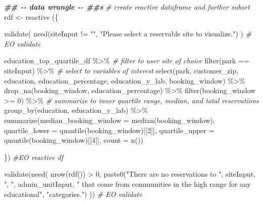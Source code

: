 \documentclass[
  11 pt,
  openany]{book}
\newenvironment{Shaded}{\begin{snugshade}}{\end{snugshade}}
\newcommand{\AttributeTok}[1]{\textcolor[rgb]{0.77,0.63,0.00}{#1}}
\newcommand{\CommentTok}[1]{\textcolor[rgb]{0.56,0.35,0.01}{\textit{#1}}}
\newcommand{\DecValTok}[1]{\textcolor[rgb]{0.00,0.00,0.81}{#1}}
\newcommand{\DocumentationTok}[1]{\textcolor[rgb]{0.56,0.35,0.01}{\textbf{\textit{#1}}}}
\newcommand{\FunctionTok}[1]{\textcolor[rgb]{0.00,0.00,0.00}{#1}}
\newcommand{\NormalTok}[1]{#1}
\newcommand{\OtherTok}[1]{\textcolor[rgb]{0.56,0.35,0.01}{#1}}
\newcommand{\SpecialCharTok}[1]{\textcolor[rgb]{0.00,0.00,0.00}{#1}}
\newcommand{\StringTok}[1]{\textcolor[rgb]{0.31,0.60,0.02}{#1}}
\begin{document}
\begin{Shaded}
\begin{Highlighting}[]
\DocumentationTok{\#\# {-}{-} data wrangle {-}{-} \#\#s}
\CommentTok{\# create reactive dataframe and further subset}
\NormalTok{rdf }\OtherTok{\textless{}{-}} \FunctionTok{reactive}\NormalTok{ (\{}
  
  \FunctionTok{validate}\NormalTok{(}
    \FunctionTok{need}\NormalTok{(siteInput }\SpecialCharTok{!=} \StringTok{""}\NormalTok{,}
         \StringTok{"Please select a reservable site to visualize."}\NormalTok{)}
\NormalTok{  ) }\CommentTok{\# EO validate}
  
\NormalTok{  education\_top\_quartile\_df }\SpecialCharTok{\%\textgreater{}\%}
    \CommentTok{\# filter to user site of choice}
    \FunctionTok{filter}\NormalTok{(park }\SpecialCharTok{==}\NormalTok{ siteInput) }\SpecialCharTok{\%\textgreater{}\%}
    \CommentTok{\# select to variables of interest}
    \FunctionTok{select}\NormalTok{(park, customer\_zip, }
\NormalTok{           education, education\_percentage, education\_y\_lab, }
\NormalTok{           booking\_window) }\SpecialCharTok{\%\textgreater{}\%} 
    \FunctionTok{drop\_na}\NormalTok{(booking\_window, education\_percentage) }\SpecialCharTok{\%\textgreater{}\%} 
    \FunctionTok{filter}\NormalTok{(booking\_window }\SpecialCharTok{\textgreater{}=} \DecValTok{0}\NormalTok{) }\SpecialCharTok{\%\textgreater{}\%} 
    \CommentTok{\# summarize to inner quartile range, median, and total reservations}
    \FunctionTok{group\_by}\NormalTok{(education, education\_y\_lab) }\SpecialCharTok{\%\textgreater{}\%} 
    \FunctionTok{summarize}\NormalTok{(}\AttributeTok{median\_booking\_window =} \FunctionTok{median}\NormalTok{(booking\_window),}
              \AttributeTok{quartile\_lower =} \FunctionTok{quantile}\NormalTok{(booking\_window)[[}\DecValTok{2}\NormalTok{]],}
              \AttributeTok{quartile\_upper =} \FunctionTok{quantile}\NormalTok{(booking\_window)[[}\DecValTok{4}\NormalTok{]],}
              \AttributeTok{count =} \FunctionTok{n}\NormalTok{())}
  
\NormalTok{\}) }\CommentTok{\#EO reactive df}

\FunctionTok{validate}\NormalTok{(}\FunctionTok{need}\NormalTok{(}
  \FunctionTok{nrow}\NormalTok{(}\FunctionTok{rdf}\NormalTok{()) }\SpecialCharTok{\textgreater{}} \DecValTok{0}\NormalTok{,}
  \FunctionTok{paste0}\NormalTok{(}\StringTok{"There are no reservations to "}\NormalTok{, siteInput, }\StringTok{", "}\NormalTok{, admin\_unitInput, }
         \StringTok{" that come from communities in the high range for any educational"}\NormalTok{, }
         \StringTok{"categories."}\NormalTok{)}
\NormalTok{)) }\CommentTok{\# EO validate}


\end{Highlighting}
\end{Shaded}
\end{document}
